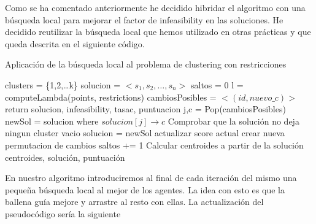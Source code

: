 \documentclass[11pt]{article}
\begin{document}
Como se ha comentado anteriormente he decidido hibridar el algoritmo con una
búsqueda local para mejorar el factor de infeasibility en las soluciones. He
decidido reutilizar la búsqueda local que hemos utilizado en otras prácticas y
que queda descrita en el siguiente código.

\begin{algorithm}[H]
  \caption{Aplicación de la búsqueda local al problema de clustering con restricciones}
  \label{alg-lsearch}
  \begin{algorithmic}[1]
    \State clusters = \{1,2,\dots k\}
    \State solucion = $<s_1,s_2, \dots,s_n>$
    \State saltos = 0
    \State l = computeLambda(points, restrictions)
    \State cambiosPosibles = $<(id,nuevo\_c)>$
    \State return solucion, infeasibility, tasac, puntuacion
    \EndIf
    \State j,c = Pop(cambiosPosibles)
    \State newSol = solucion where $solucion[j]\rightarrow c$
    \State Comprobar que la solución no deja ningun cluster vacio
    \State solucion = newSol
    \State actualizar score actual
    \State crear nueva permutacion de cambios
    \State saltos += 1
    \EndIf
    \EndFor
    \State Calcular centroides a partir de la solución 
    \State 
    \Return centroides, solución, puntuación
    \EndProcedure
  \end{algorithmic}
  \end{algorithm}

En nuestro algoritmo introduciremos al final de cada iteración del mismo una
pequeña búsqueda local al mejor de los agentes. La idea con esto es que la
ballena guía mejore y arrastre al resto con ellas. La actualización del
pseudocódigo sería la siguiente
\end{document}
